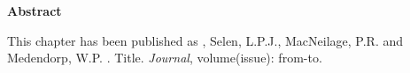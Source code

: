 
\thispagestyle{empty}

\chapter{}
\chaptermark{}

\newpage

\small {\bf Abstract} 

\vfill

\noindent\underline{ \hspace{4cm} }

\noindent This chapter has been published as \newline
{}, Selen, L.P.J., MacNeilage, P.R. and Medendorp, W.P. \citeyear{clemens2014}. Title. \emph{Journal}, volume(issue): from-to. \newline

\newpage






